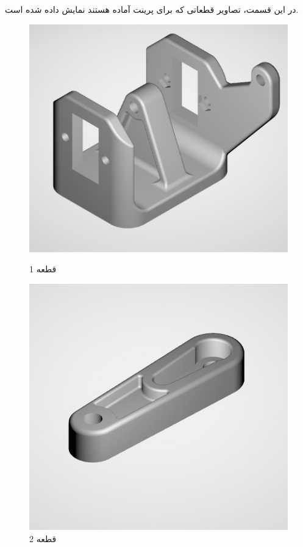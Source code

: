 \documentclass{article}
\begin{document}
در این قسمت، تصاویر قطعاتی که برای پرینت آماده هستند نمایش داده شده است. 
\begin{figure}[H]
    \centering
    \begin{minipage}{0.5\linewidth}
        \centering
        \includegraphics[width=0.9\linewidth]{1.JPG}
        \caption{قطعه 1}
        \label{fig:label1}
    \end{minipage}%
    \begin{minipage}{0.5\linewidth}
        \centering
        \includegraphics[width=0.9\linewidth]{2.JPG}
        \caption{قطعه 2}
        \label{fig:label2}
    \end{minipage}
\end{figure}
\end{document}
